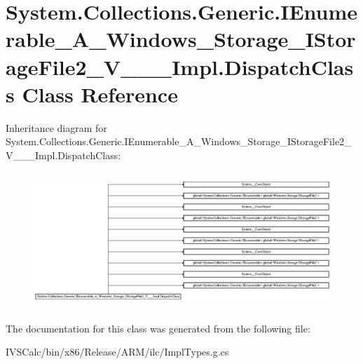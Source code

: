 \hypertarget{class_system_1_1_collections_1_1_generic_1_1_i_enumerable___a___windows___storage___i_storage_ficaf5042e250db3fd656694b794c0e9e9}{}\section{System.\+Collections.\+Generic.\+I\+Enumerable\+\_\+\+A\+\_\+\+Windows\+\_\+\+Storage\+\_\+\+I\+Storage\+File2\+\_\+\+V\+\_\+\+\_\+\+\_\+\+Impl.\+Dispatch\+Class Class Reference}
\label{class_system_1_1_collections_1_1_generic_1_1_i_enumerable___a___windows___storage___i_storage_ficaf5042e250db3fd656694b794c0e9e9}
Inheritance diagram for System.\+Collections.\+Generic.\+I\+Enumerable\+\_\+\+A\+\_\+\+Windows\+\_\+\+Storage\+\_\+\+I\+Storage\+File2\+\_\+\+V\+\_\+\+\_\+\+\_\+\+Impl.\+Dispatch\+Class\+:\begin{figure}[H]
\begin{center}
\leavevmode
\includegraphics[height=5.150502cm]{class_system_1_1_collections_1_1_generic_1_1_i_enumerable___a___windows___storage___i_storage_ficaf5042e250db3fd656694b794c0e9e9}
\end{center}
\end{figure}


The documentation for this class was generated from the following file\+:\begin{DoxyCompactItemize}
\item 
I\+V\+S\+Calc/bin/x86/\+Release/\+A\+R\+M/ilc/Impl\+Types.\+g.\+cs\end{DoxyCompactItemize}
